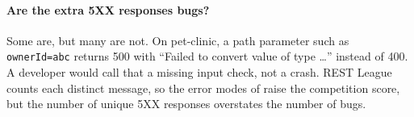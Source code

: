 \paragraph{Are the extra 5XX responses bugs?} Some are, but many are not.
On pet-clinic, a path parameter such as \texttt{ownerId=abc} returns 500
with ``Failed to convert value of type \ldots'' instead of 400. A developer
would call that a missing input check, not a crash. REST League counts each
distinct message, so the error modes of \tool raise the competition score,
but the number of unique 5XX responses overstates the number of bugs.
